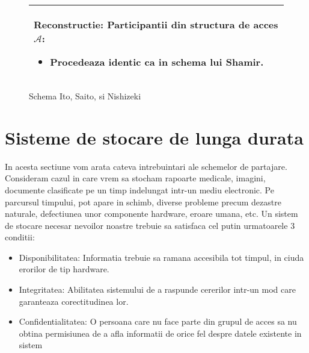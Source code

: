 \documentclass{llncs}
\begin{document}
\begin{figure*}[h!]
\begin{tabular}{|p{\textwidth}|}
\hspace{.1in}
\textbf{Reconstructie}: Participantii din structura de acces $\mathcal{A}$:
	\begin{itemize}
		\item Procedeaza identic ca in schema lui Shamir.
	\end{itemize}


\\
\hline
\end{tabular}

\caption{Schema Ito, Saito, si Nishizeki \cite{ITO:1989}}
\label{fig:ito_et_al}
\end{figure*}




\section{Sisteme de stocare de lunga durata}

In acesta sectiune vom arata cateva intrebuintari ale schemelor de partajare. Consideram cazul in care vrem sa stocham rapoarte medicale, imagini, documente clasificate pe un timp indelungat intr-un mediu electronic. Pe parcursul timpului, pot apare in schimb, diverse probleme precum dezastre naturale, defectiunea unor componente hardware, eroare umana, etc. \cite{SGMV:2009}
Un sistem de stocare necesar nevoilor noastre trebuie sa satisfaca cel putin urmatoarele 3 conditii:
\begin{itemize}
	\item Disponibilitatea: Informatia trebuie sa ramana accesibila tot timpul, in ciuda erorilor de tip hardware.
	\item Integritatea: Abilitatea sistemului de a raspunde cererilor intr-un mod care garanteaza corectitudinea lor.
	\item Confidentialitatea: O persoana care nu face parte din grupul de acces sa nu obtina permisiunea de a afla informatii de orice fel despre datele existente in sistem
\end{itemize}
\end{document}
